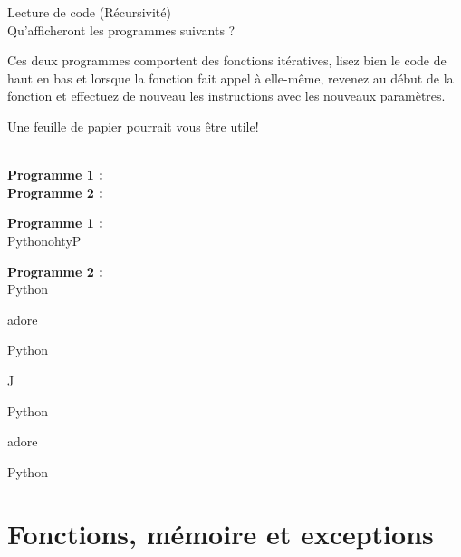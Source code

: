 \begin{Exercice}[5 minutes] Lecture de code (Récursivité)\\

Qu'afficheront les programmes suivants ? \\

\begin{conseil}
   Ces deux programmes comportent des fonctions itératives, lisez bien le code de haut en bas et lorsque la fonction fait appel à elle-même, revenez au début de la fonction et effectuez de nouveau les instructions avec les nouveaux paramètres.
   
   Une feuille de papier pourrait vous être utile!\\
\end{conseil}

\textbf{\\Programme 1 :} \\

     

\textbf{Programme 2 :} \\

    

    
\begin{solution}
    \textbf{Programme 1 :} \\

    PythonohtyP
    
\end{solution}


\begin{solution}   
    \textbf{Programme 2 :} \\

    Python
    
    adore
    
    Python
    
    J
    
    Python
    
    adore
    
    Python
    
\end{solution}

\end{Exercice}

\section{Fonctions, mémoire et exceptions}


